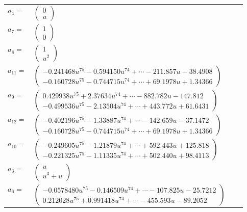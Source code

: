 \documentclass[1p]{elsarticle_modified}
\theoremstyle{definition}
\begin{document}
\begin{tabular}{m{7pt} m{180pt} m{7pt} m{180pt} }
\flushright $a_{4}=$&$\begin{pmatrix}0\\u\end{pmatrix}$ \\
\flushright $a_{7}=$&$\begin{pmatrix}1\\0\end{pmatrix}$ \\
\flushright $a_{8}=$&$\begin{pmatrix}1\\u^2\end{pmatrix}$ \\
\flushright $a_{11}=$&$\begin{pmatrix}-0.241468 u^{75}-0.594150 u^{74}+\cdots-211.857 u-38.4908\\-0.160728 u^{75}-0.744715 u^{74}+\cdots+69.1978 u+1.34366\end{pmatrix}$ \\
\flushright $a_{9}=$&$\begin{pmatrix}0.429938 u^{75}+2.37634 u^{74}+\cdots-882.782 u-147.812\\-0.499536 u^{75}-2.13504 u^{74}+\cdots+443.772 u+61.6431\end{pmatrix}$ \\
\flushright $a_{12}=$&$\begin{pmatrix}-0.402196 u^{75}-1.33887 u^{74}+\cdots-142.659 u-37.1472\\-0.160728 u^{75}-0.744715 u^{74}+\cdots+69.1978 u+1.34366\end{pmatrix}$ \\
\flushright $a_{10}=$&$\begin{pmatrix}-0.249605 u^{75}-1.21879 u^{74}+\cdots+592.443 u+125.818\\-0.221325 u^{75}-1.11335 u^{74}+\cdots+502.440 u+98.4113\end{pmatrix}$ \\
\flushright $a_{3}=$&$\begin{pmatrix}u\\u^3+u\end{pmatrix}$ \\
\flushright $a_{6}=$&$\begin{pmatrix}-0.0578480 u^{75}-0.146509 u^{74}+\cdots-107.825 u-25.7212\\0.212028 u^{75}+0.991418 u^{74}+\cdots-455.593 u-89.2052\end{pmatrix}$ \\

\end{tabular}
\end{document}
